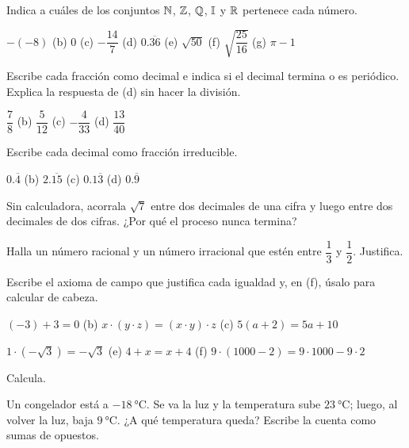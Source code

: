 \documentclass[11pt,a4paper]{article}
\newcommand{\per}[1]{\overline{#1}}
\begin{document}
\taller
\begin{ejercicios}
\item Indica a cuáles de los conjuntos $\mathbb{N}$, $\mathbb{Z}$, $\mathbb{Q}$, $\mathbb{I}$ y $\mathbb{R}$ pertenece cada número.
  \begin{ejercicios}
  \item $-(-8)$ \quad (b) $0$ \quad (c) $-\dfrac{14}{7}$ \quad (d) $0.\per{36}$ \quad (e) $\sqrt{50}$ \quad (f) $\sqrt{\dfrac{25}{16}}$ \quad (g) $\pi-1$
  \end{ejercicios}
\item Escribe cada fracción como decimal e indica si el decimal termina o es periódico. Explica la respuesta de (d)
  sin hacer la división.
  \begin{ejercicios}
  \item $\dfrac78$ \quad (b) $\dfrac{5}{12}$ \quad (c) $-\dfrac{4}{33}$ \quad (d) $\dfrac{13}{40}$
  \end{ejercicios}
\item Escribe cada decimal como fracción irreducible.
  \begin{ejercicios}
  \item $0.\per4$ \quad (b) $2.\per{15}$ \quad (c) $0.1\per3$ \quad (d) $0.\per9$
  \end{ejercicios}
\item Sin calculadora, acorrala $\sqrt7$ entre dos decimales de una cifra y luego entre dos decimales de dos cifras.
  ¿Por qué el proceso nunca termina?
\item Halla un número racional y un número irracional que estén entre $\dfrac13$ y $\dfrac12$. Justifica.
\item Escribe el axioma de campo que justifica cada igualdad y, en (f), úsalo para calcular de cabeza.
  \begin{ejercicios}
  \item $(-3)+3=0$ \quad (b) $x\cdot(y\cdot z)=(x\cdot y)\cdot z$ \quad (c) $5(a+2)=5a+10$
  \item $1\cdot(-\sqrt3)=-\sqrt3$ \quad (e) $4+x=x+4$ \quad (f) $9\cdot(1000-2)=9\cdot1000-9\cdot2$
  \end{ejercicios}
\item Calcula.
  \begin{ejercicios}
  \item Un congelador está a $\SI{-18}{\celsius}$. Se va la luz y la temperatura sube $\SI{23}{\celsius}$; luego,
        al volver la luz, baja $\SI{9}{\celsius}$. ¿A qué temperatura queda? Escribe la cuenta como sumas de opuestos.

\end{ejercicios}
\end{ejercicios}
\end{document}

